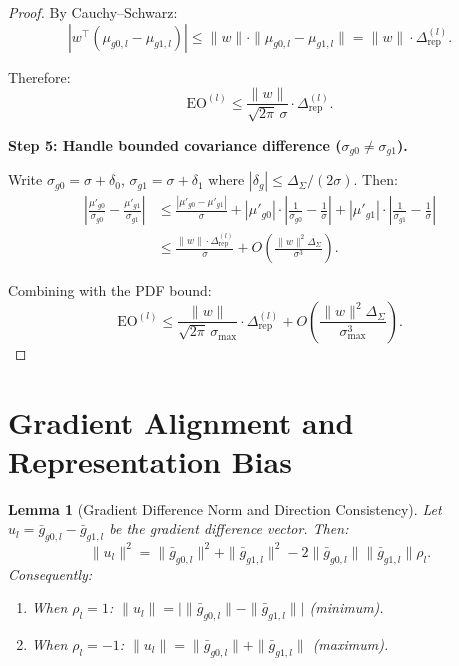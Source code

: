 \documentclass[11pt]{article}
\newtheorem{lemma}[theorem]{Lemma}
\begin{document}
\begin{proof}
    By Cauchy--Schwarz:
    \begin{equation}
        |w^\top(\mu_{g0,l} - \mu_{g1,l})| \leq \|w\| \cdot \|\mu_{g0,l} - \mu_{g1,l}\| = \|w\| \cdot \Delta_{\mathrm{rep}}^{(l)}.
    \end{equation}

    Therefore:
    \begin{equation}
        \mathrm{EO}^{(l)} \leq \frac{\|w\|}{\sqrt{2\pi}\,\sigma} \cdot \Delta_{\mathrm{rep}}^{(l)}.
    \end{equation}

    \textbf{Step 5: Handle bounded covariance difference ($\sigma_{g0} \neq \sigma_{g1}$).}

    Write $\sigma_{g0} = \sigma + \delta_0$, $\sigma_{g1} = \sigma + \delta_1$ where $|\delta_g| \leq \Delta_\Sigma/(2\sigma)$. Then:
    \begin{align}
        \left|\frac{\mu'_{g0}}{\sigma_{g0}} - \frac{\mu'_{g1}}{\sigma_{g1}}\right|
        &\leq \frac{|\mu'_{g0} - \mu'_{g1}|}{\sigma} + |\mu'_{g0}| \cdot \left|\frac{1}{\sigma_{g0}} - \frac{1}{\sigma}\right| + |\mu'_{g1}| \cdot \left|\frac{1}{\sigma_{g1}} - \frac{1}{\sigma}\right| \\
        &\leq \frac{\|w\| \cdot \Delta_{\mathrm{rep}}^{(l)}}{\sigma} + O\!\left(\frac{\|w\|^2 \Delta_\Sigma}{\sigma^3}\right).
    \end{align}

    Combining with the PDF bound:
    \begin{equation}
        \mathrm{EO}^{(l)} \leq \frac{\|w\|}{\sqrt{2\pi}\,\sigma_{\max}} \cdot \Delta_{\mathrm{rep}}^{(l)} + O\!\left(\frac{\|w\|^2 \Delta_\Sigma}{\sigma_{\max}^3}\right).
    \end{equation}
\end{proof}


\section{Gradient Alignment and Representation Bias}

\begin{lemma}[Gradient Difference Norm and Direction Consistency]
    \label{lem:grad_diff}
    Let $u_l = \bar{g}_{g0,l} - \bar{g}_{g1,l}$ be the gradient difference vector. Then:
    \begin{equation}
        \|u_l\|^2 = \|\bar{g}_{g0,l}\|^2 + \|\bar{g}_{g1,l}\|^2 - 2\|\bar{g}_{g0,l}\|\|\bar{g}_{g1,l}\|\rho_l.
    \end{equation}
    Consequently:
    \begin{enumerate}
        \item[(a)] When $\rho_l = 1$: $\|u_l\| = \big|\|\bar{g}_{g0,l}\| - \|\bar{g}_{g1,l}\|\big|$ (minimum).
        \item[(b)] When $\rho_l = -1$: $\|u_l\| = \|\bar{g}_{g0,l}\| + \|\bar{g}_{g1,l}\|$ (maximum).
    \end{enumerate}
\end{lemma}
\end{document}
